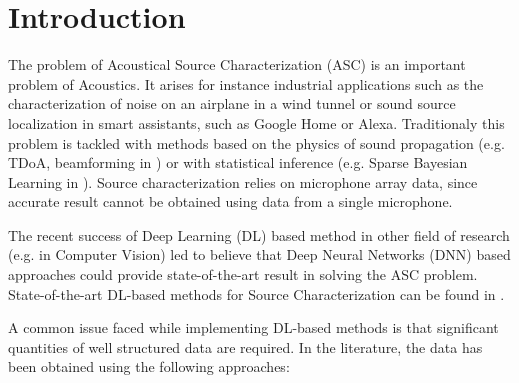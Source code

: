 \documentclass[11pt,a4paper,twoside]{report}
\begin{document}
\clearpage

\cleardoublepage

\pagestyle{fancy}
\renewcommand{\chaptermark}[1]{\markboth{#1}{}}
\renewcommand{\sectionmark}[1]{\markright{\thesection\ #1}}
\fancyhead{}

\fancyhead[LO]{\scshape \contentsname}
\fancyhead[RE]{\scshape \contentsname}
\tableofcontents

\cleardoublepage

\setcounter{chapter}{0}
\setcounter{figure}{0}
\fancyhead[LO]{\rightmark}
\fancyhead[RO]{\scshape \chaptername\ \thechapter}
\fancyhead[LE]{\scshape \chaptername\ \thechapter}
\fancyhead[RE]{\textsc{\leftmark}}


\chapter{Introduction}


The problem of Acoustical Source Characterization (ASC) is an important problem  of Acoustics. It arises for instance industrial applications such as the characterization of noise on an airplane in a wind tunnel or sound source localization in smart assistants, such as Google Home or Alexa. Traditionaly this problem is tackled with methods based on the physics of sound propagation (e.g. TDoA, beamforming in \cite{merino2019review}) or with statistical inference (e.g. Sparse Bayesian Learning in \cite{gerstoft2016multisnapshot}). Source characterization relies on microphone array data, since accurate result cannot be obtained using data from a single microphone. 

The recent success of Deep Learning (DL) based method in other field of research (e.g. \cite{ronneberger2015u} in Computer Vision) led to believe that Deep Neural Networks (DNN) based approaches could provide state-of-the-art result in solving the ASC problem. State-of-the-art DL-based methods for Source Characterization can be found in \cite{grumiaux2022survey}.

A common issue faced while implementing DL-based methods is that significant quantities of well structured data are required. In the literature, the data has been obtained using the following approaches:
\end{document}
